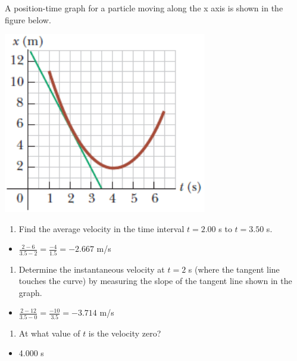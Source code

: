 \documentclass[
  letterpaper,
  DIV=11,
  numbers=noendperiod]{scrartcl}
\providecommand{\tightlist}{%
  \setlength{\itemsep}{0pt}\setlength{\parskip}{0pt}}\usepackage{longtable,booktabs,array}
\begin{document}
A position-time graph for a particle moving along the x axis is shown in
the figure below.

\includegraphics{img/Kinematics Velocity and Position HW/problem3.png}

\begin{enumerate}
\def\labelenumi{(\alph{enumi})}
\tightlist
\item
  Find the average velocity in the time interval \(t = 2.00\) s to
  \(t = 3.50\) s.
\end{enumerate}

\begin{itemize}
\tightlist
\item
  \(\frac{2-6}{3.5-2}=\frac{-4}{1.5}=-2.667\) m/s
\end{itemize}

\begin{enumerate}
\def\labelenumi{(\alph{enumi})}
\setcounter{enumi}{1}
\tightlist
\item
  Determine the instantaneous velocity at \(t = 2\) s (where the tangent
  line touches the curve) by measuring the slope of the tangent line
  shown in the graph.
\end{enumerate}

\begin{itemize}
\tightlist
\item
  \(\frac{2-12}{3.5-0} = \frac{-10}{3.5} = -3.714\) m/s
\end{itemize}

\begin{enumerate}
\def\labelenumi{(\alph{enumi})}
\setcounter{enumi}{2}
\tightlist
\item
  At what value of \(t\) is the velocity zero?
\end{enumerate}

\begin{itemize}
\tightlist
\item
  4.000 s
\end{itemize}
\end{document}
